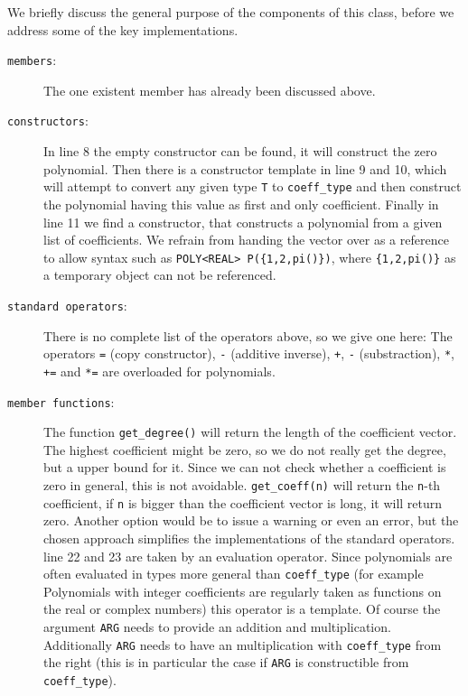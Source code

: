 \documentclass{article}
\newcommand{\code}[1]{\texttt{#1}}
\begin{document}
We briefly discuss the general purpose of the components of this class, before we address some of the key implementations.
\begin{description}
\item[\code{members}:] The one existent member has already been discussed above.
\item[\code{constructors}:] In line 8 the empty constructor can be found, it will construct the zero polynomial. Then there is a constructor template in line 9 and 10, which will attempt to convert any given type \code{T} to \code{coeff\_type} and then construct the polynomial having this value as first and only coefficient. Finally in line 11 we find a constructor, that constructs a polynomial from a given list of coefficients. We refrain from handing the vector over as a reference to allow syntax such as \code{POLY<REAL> P(\{1,2,pi()\})}, where \code{\{1,2,pi()\}} as a temporary object can not be referenced.
\item[\code{standard operators}:] There is no complete list of the operators above, so we give one here: The operators \code{=} (copy constructor), \code{-} (additive inverse), \code{+}, \code{-} (substraction), \code{*}, \code{+=} and \code{*=} are overloaded for polynomials.
\item[\code{member functions}:] The function \code{get\_degree()} will return the length of the coefficient vector. The highest coefficient might be zero, so we do not really get the degree, but a upper bound for it. Since we can not check whether a coefficient is zero in general, this is not avoidable. \code{get\_coeff(n)} will return the \code{n}-th coefficient, if \code{n} is bigger than the coefficient vector is long, it will return zero. Another option would be to issue a warning or even an error, but the chosen approach simplifies the implementations of the standard operators. line 22 and 23 are taken by an evaluation operator. Since polynomials are often evaluated in types more general than \code{coeff\_type} (for example Polynomials with integer coefficients are regularly taken as functions on the real or complex numbers) this operator is a template. Of course the argument \code{ARG} needs to provide an addition and multiplication. Additionally \code{ARG} needs to have an multiplication with \code{coeff\_type} from the right (this is in particular the case if \code{ARG} is constructible from \code{coeff\_type}).
\end{description}
\end{document}
